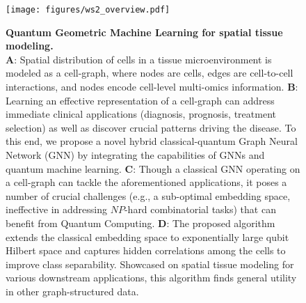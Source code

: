 \documentclass{article}
\begin{document}
\begin{figure}[ht]
    \centering
\texttt{[image: figures/ws2\_overview.pdf]}
    \caption{\textbf{Quantum Geometric Machine Learning for spatial tissue modeling.}\\
    \textbf{A}: Spatial distribution of cells in a tissue microenvironment is modeled as a cell-graph, where nodes are cells, edges are cell-to-cell interactions, and  
    nodes encode cell-level multi-omics information.
    \textbf{B}: Learning an effective representation of a cell-graph can address immediate clinical applications (diagnosis, prognosis, treatment selection) as well as discover crucial patterns driving the disease. To this end, we propose a novel hybrid classical-quantum Graph Neural Network (GNN) by integrating the capabilities of GNNs and quantum machine learning.
    \textbf{C}: Though a classical GNN operating on a cell-graph can tackle the aforementioned applications, it poses a number of crucial challenges (e.g., a sub-optimal embedding space, ineffective in addressing $NP$-hard combinatorial tasks) that can benefit from Quantum Computing.
    \textbf{D}: The proposed algorithm extends the classical embedding space to exponentially large qubit Hilbert space and captures hidden correlations among the cells to improve class separability. Showcased on spatial tissue modeling for various downstream applications, this algorithm finds general utility in other graph-structured data.
    }
    \label{fig:spatial_tissue_modeling}
\end{figure}
\end{document}
